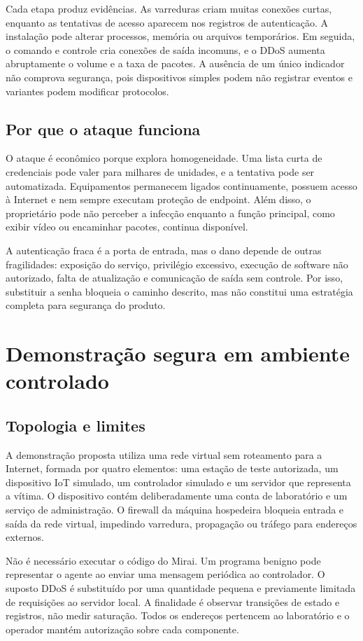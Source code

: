 \documentclass[11pt,a4paper]{article}
\begin{document}
Cada etapa produz evidências. As varreduras criam muitas conexões curtas, enquanto as tentativas de acesso aparecem nos registros de autenticação. A instalação pode alterar processos, memória ou arquivos temporários. Em seguida, o comando e controle cria conexões de saída incomuns, e o DDoS aumenta abruptamente o volume e a taxa de pacotes. A ausência de um único indicador não comprova segurança, pois dispositivos simples podem não registrar eventos e variantes podem modificar protocolos.

\subsection{Por que o ataque funciona}
O ataque é econômico porque explora homogeneidade. Uma lista curta de credenciais pode valer para milhares de unidades, e a tentativa pode ser automatizada. Equipamentos permanecem ligados continuamente, possuem acesso à Internet e nem sempre executam proteção de endpoint. Além disso, o proprietário pode não perceber a infecção enquanto a função principal, como exibir vídeo ou encaminhar pacotes, continua disponível.

A autenticação fraca é a porta de entrada, mas o dano depende de outras fragilidades: exposição do serviço, privilégio excessivo, execução de software não autorizado, falta de atualização e comunicação de saída sem controle. Por isso, substituir a senha bloqueia o caminho descrito, mas não constitui uma estratégia completa para segurança do produto.

\section{Demonstração segura em ambiente controlado}
\subsection{Topologia e limites}
A demonstração proposta utiliza uma rede virtual sem roteamento para a Internet, formada por quatro elementos: uma estação de teste autorizada, um dispositivo IoT simulado, um controlador simulado e um servidor que representa a vítima. O dispositivo contém deliberadamente uma conta de laboratório e um serviço de administração. O firewall da máquina hospedeira bloqueia entrada e saída da rede virtual, impedindo varredura, propagação ou tráfego para endereços externos.

Não é necessário executar o código do Mirai. Um programa benigno pode representar o agente ao enviar uma mensagem periódica ao controlador. O suposto DDoS é substituído por uma quantidade pequena e previamente limitada de requisições ao servidor local. A finalidade é observar transições de estado e registros, não medir saturação. Todos os endereços pertencem ao laboratório e o operador mantém autorização sobre cada componente.
\end{document}
